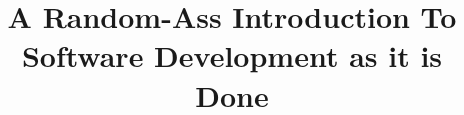 \documentclass{beamer}
\title{A Random-Ass Introduction To Software Development as it is Done}
\author{}
\date{}
\begin{document}
\begin{frame}
\titlepage
\end{frame}



\end{document}
